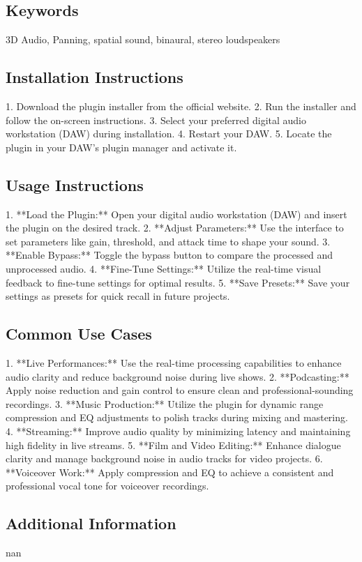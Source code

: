 \documentclass[8pt]{article}
\begin{document}
    \subsection*{Keywords}
    3D Audio, Panning, spatial sound, binaural, stereo loudspeakers

    \subsection*{Installation Instructions}
    1. Download the plugin installer from the official website.
2. Run the installer and follow the on-screen instructions.
3. Select your preferred digital audio workstation (DAW) during installation.
4. Restart your DAW.
5. Locate the plugin in your DAW’s plugin manager and activate it.

    \subsection*{Usage Instructions}
    1. **Load the Plugin:** Open your digital audio workstation (DAW) and insert the plugin on the desired track.
2. **Adjust Parameters:** Use the interface to set parameters like gain, threshold, and attack time to shape your sound.
3. **Enable Bypass:** Toggle the bypass button to compare the processed and unprocessed audio.
4. **Fine-Tune Settings:** Utilize the real-time visual feedback to fine-tune settings for optimal results.
5. **Save Presets:** Save your settings as presets for quick recall in future projects.

    \subsection*{Common Use Cases}
    1. **Live Performances:** Use the real-time processing capabilities to enhance audio clarity and reduce background noise during live shows.
2. **Podcasting:** Apply noise reduction and gain control to ensure clean and professional-sounding recordings.
3. **Music Production:** Utilize the plugin for dynamic range compression and EQ adjustments to polish tracks during mixing and mastering.
4. **Streaming:** Improve audio quality by minimizing latency and maintaining high fidelity in live streams.
5. **Film and Video Editing:** Enhance dialogue clarity and manage background noise in audio tracks for video projects.
6. **Voiceover Work:** Apply compression and EQ to achieve a consistent and professional vocal tone for voiceover recordings.

    \subsection*{Additional Information}
    nan
    
\end{document}
